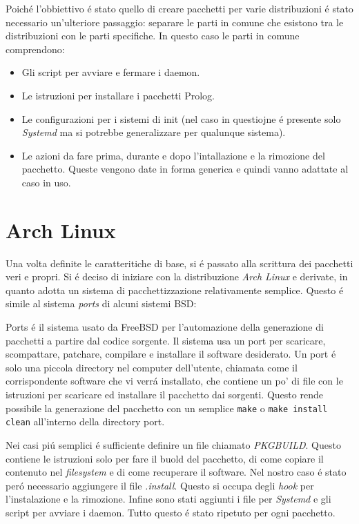\documentclass[10pt,titlepage,twoside,a4paper]{report}
\begin{document}
Poich\'e l'obbiettivo \'e stato quello di creare pacchetti per varie 
distribuzioni \'e stato necessario un'ulteriore passaggio: separare le parti in 
comune che esistono tra le distribuzioni con le parti specifiche. In questo 
caso le parti in comune comprendono:
\begin{itemize}
    \item Gli script per avviare e fermare i daemon.
    \item Le istruzioni per installare i pacchetti Prolog.
    \item Le configurazioni per i sistemi di init (nel caso in questiojne \'e 
presente solo \emph{Systemd} ma si potrebbe generalizzare per qualunque 
sistema).
    \item Le azioni da fare prima, durante e dopo l'intallazione e la rimozione 
del pacchetto. Queste vengono date in forma generica e quindi vanno adattate al 
caso in uso.
\end{itemize}

\section{Arch Linux}
Una volta definite le caratteritiche di base, si \'e passato alla scrittura dei 
pacchetti veri e propri. Si \'e deciso di iniziare con la 
distribuzione \emph{Arch Linux} e derivate, in quanto adotta un sistema di 
pacchettizzazione relativamente semplice. Questo \'e simile al sistema 
\emph{ports} di alcuni sistemi BSD\cite{portsLikeSystem}:
\begin{displayquote}
Ports \'e il sistema usato da FreeBSD per l'automazione della generazione di 
pacchetti a partire dal codice sorgente. Il sistema usa un port per scaricare, 
scompattare, patchare, compilare e installare il software desiderato. Un port 
\'e solo una piccola directory nel computer dell'utente, chiamata come il 
corrispondente software che vi verr\'a installato, che contiene un po' di file 
con le istruzioni per scaricare ed installare il pacchetto dai sorgenti. Questo 
rende possibile la generazione del pacchetto con un semplice \texttt{make} o 
\texttt{make install clean} all'interno della directory port.
\end{displayquote}

Nei casi pi\'u semplici \'e sufficiente definire un file chiamato 
\emph{PKGBUILD}. Questo contiene le istruzioni solo per fare il buold del 
pacchetto, di come copiare il contenuto nel \emph{filesystem} e di come 
recuperare il software. Nel nostro caso \'e stato per\'o necessario aggiungere
il file \emph{.install}. Questo si occupa degli \emph{hook} per l'instalazione 
e la rimozione. Infine sono stati aggiunti i file per \emph{Systemd} e gli 
script per avviare i daemon. Tutto questo \'e stato ripetuto per ogni 
pacchetto.
\end{document}
